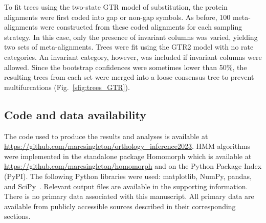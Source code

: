 To fit trees using the two-state GTR model of substitution, the protein alignments were first coded into gap or non-gap symbols. As before, 100 meta-alignments were constructed from these coded alignments for each sampling strategy. In this case, only the presence of invariant columns was varied, yielding two sets of meta-alignments. Trees were fit using the GTR2 model with no rate categories. An invariant category, however, was included if invariant columns were allowed. Since the bootstrap confidences were sometimes lower than 50\%, the resulting trees from each set were merged into a loose consensus tree to prevent multifurcations (Fig.~\ref{sfig:trees_GTR}).

\subsection{Code and data availability}
\begin{sloppypar}
The code used to produce the results and analyses is available at \url{https://github.com/marcsingleton/orthology_inference2023}. HMM algorithms were implemented in the standalone package Homomorph which is available at \url{https://github.com/marcsingleton/homomorph} and on the Python Package Index (PyPI). The following Python libraries were used: matplotlib, NumPy, pandas, and SciPy~\cite{Hunter2007, Harris2020, McKinney2010, Virtanen2020}. Relevant output files are available in the supporting information. There is no primary data associated with this manuscript. All primary data are available from publicly accessible sources described in their corresponding sections.
\end{sloppypar}
